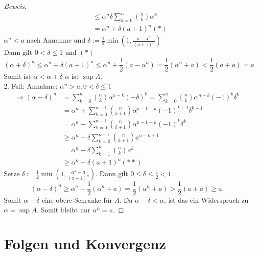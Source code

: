 \documentclass[12pt,a4paper,titlepage]{article} %
\theoremstyle{definition}
\theoremstyle{remark}
\newenvironment{bew}{\begin{proof}[Beweis]}{\end{proof}}
\begin{document}
\begin{bew}
\begin{align*}
		&\leq \alpha^n \delta \sum_{k=0}^{n} \binom{n}{k} \alpha^{k}\\
		&= \alpha^n + \delta(a+1)^n (*)
	\end{align*}
	$\alpha^n <a$ nach Annahme und $\delta := \frac{1}{2} \min\left(1, \frac{a-\alpha^n}{(a+1)^n}\right)$\\
	Dann gilt $0<\delta\leq 1$ und $(*)$
	$$(\alpha + \delta)^n \leq \alpha^n + \delta(a+1)^n \leq \alpha^n + \frac{1}{2} (a-\alpha^n) = \frac{1}{2} (\alpha^n+a) < \frac{1}{2} (a+a) =a$$
	Somit ist $\alpha < \alpha + \delta$ \Lightning $\alpha$ ist $\sup A$.\\
	2. Fall: Annahme: $\alpha^n > a, 0<\delta \leq 1$
	\begin{align*}
		\Rightarrow (\alpha - \delta)^n &= \sum_{k=0}^{n} \binom{n}{k} \alpha^{n-k} (-\delta)^k = \sum_{k=0}^{n} \binom{n}{k} \alpha^{n-k} (-1)^k\delta^k \\
		&= \alpha^n + \sum_{k=0}^{n-1} \binom{n}{k+1} \alpha^{n-1-k} (-1)^{k+1}\delta^{k+1}\\
		&= \alpha^n - \sum_{k=0}^{n-1} \binom{n}{k+1} \alpha^{n-1-k} (-1)^{k} \delta^k\\
		&\geq \alpha^n - \delta \sum_{k=0}^{n-1} \binom{n}{k+1} a^{n-k+1}\\
		&= \alpha^n - \delta \sum_{k=1}^{n} \binom{n}{k} a^k\\
		&\geq \alpha^n - \delta (a+1)^n (**)
	\end{align*}
	Setze $\delta := \frac{1}{2} \min \left(1, \frac{\alpha^n-a}{(a+1)^n} \right)$. Dann gilt $0\leq\delta\leq \frac{1}{2}<1$.
	$$(\alpha -\delta)^n \geq \alpha^n - \frac{1}{2} (\alpha^n + a) = \frac{1}{2} (\alpha^n + a) > \frac{1}{2} (a + a) \geq a.$$
	Somit $\alpha - \delta$ eine obere Schranke für $A$. Da $\alpha - \delta<\alpha$, ist das ein Widerspruch zu $\alpha = \sup A$. Somit bleibt nur $\alpha^n = a$.
\end{bew}
\section{Folgen und Konvergenz}
\end{document}
